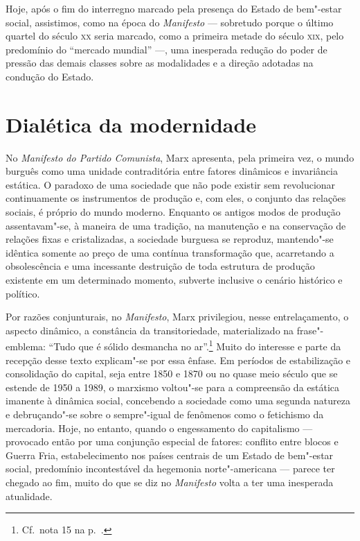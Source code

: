 Hoje, após o fim do interregno marcado pela presença do Estado de
bem"-estar social, assistimos, como na época do \textit{Manifesto
} --- sobretudo porque o último quartel do século \textsc{xx} seria marcado, como a
primeira metade do século \textsc{xix}, pelo predomínio do “mercado mundial” ---,
uma inesperada redução do poder de pressão das demais classes sobre as
modalidades e a direção adotadas na condução do Estado.

\section*{Dialética da modernidade}

No \textit{Manifesto do Partido Comunista}, Marx apresenta,
pela primeira vez, o mundo burguês como uma unidade contraditória entre
fatores dinâmicos e invariância estática. O paradoxo de uma sociedade
que não pode existir sem revolucionar continuamente os instrumentos de
produção e, com eles, o conjunto das relações sociais, é próprio do
mundo moderno. Enquanto os antigos modos de produção assentavam"-se, à
maneira de uma tradição, na manutenção e na conservação de relações fixas
e cristalizadas, a sociedade burguesa se reproduz, mantendo"-se
idêntica somente ao preço de uma contínua transformação que,
acarretando a obsolescência e uma incessante destruição de toda
estrutura de produção existente em um determinado momento, subverte
inclusive o cenário histórico e político.

Por razões conjunturais, no \textit{Manifesto}, Marx privilegiou, nesse entrelaçamento, o aspecto dinâmico, a constância
da transitoriedade, materializado na frase"-emblema: “Tudo que é
sólido desmancha no ar”.\footnote{ Cf.~nota 15 na p.~\pageref{2}.} Muito do interesse e parte da recepção desse
texto explicam"-se por essa ênfase. Em períodos de estabilização e
consolidação do capital, seja entre 1850 e 1870 ou no quase meio século
que se estende de 1950 a 1989, o marxismo voltou"-se para a
compreensão da estática imanente à dinâmica social, concebendo a
sociedade como uma segunda natureza e debruçando"-se sobre o
sempre"-igual de fenômenos como o fetichismo da mercadoria. Hoje, no
entanto, quando o engessamento do capitalismo --- provocado então por uma
conjunção especial de fatores: conflito entre blocos e Guerra Fria,
estabelecimento nos países centrais de um Estado de bem"-estar social,
predomínio incontestável da hegemonia norte"-americana --- parece ter
chegado ao fim, muito do que se diz no \textit{Manifesto} volta a ter
uma inesperada atualidade.

